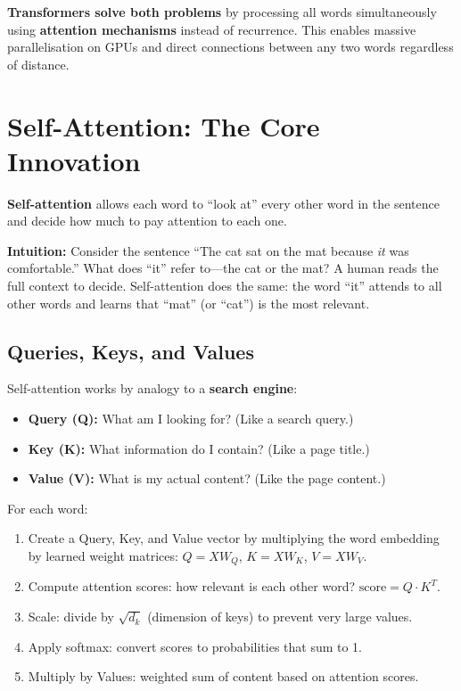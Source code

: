 \documentclass[12pt, a4paper, oneside]{book}
\begin{document}
\textbf{Transformers solve both problems} by processing all words simultaneously using \textbf{attention mechanisms} instead of recurrence. This enables massive parallelisation on GPUs and direct connections between any two words regardless of distance.

\section{Self-Attention: The Core Innovation}

\textbf{Self-attention} allows each word to ``look at'' every other word in the sentence and decide how much to pay attention to each one.

\textbf{Intuition:} Consider the sentence ``The cat sat on the mat because \emph{it} was comfortable.'' What does ``it'' refer to---the cat or the mat? A human reads the full context to decide. Self-attention does the same: the word ``it'' attends to all other words and learns that ``mat'' (or ``cat'') is the most relevant.

\subsection{Queries, Keys, and Values}

Self-attention works by analogy to a \textbf{search engine}:

\begin{itemize}[leftmargin=2em]
    \item \textbf{Query (Q):} What am I looking for? (Like a search query.)
    \item \textbf{Key (K):} What information do I contain? (Like a page title.)
    \item \textbf{Value (V):} What is my actual content? (Like the page content.)
\end{itemize}

For each word:
\begin{enumerate}[leftmargin=2em]
    \item Create a Query, Key, and Value vector by multiplying the word embedding by learned weight matrices: $Q = X W_Q$, $K = X W_K$, $V = X W_V$.
    \item Compute attention scores: how relevant is each other word? $\text{score} = Q \cdot K^T$.
    \item Scale: divide by $\sqrt{d_k}$ (dimension of keys) to prevent very large values.
    \item Apply softmax: convert scores to probabilities that sum to 1.
    \item Multiply by Values: weighted sum of content based on attention scores.
\end{enumerate}
\end{document}
